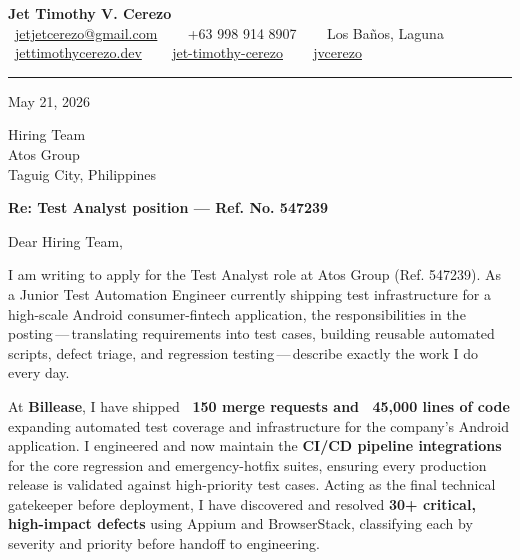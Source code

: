 \documentclass[11pt,a4paper]{article}
\begin{document}
\begin{center}
  {\LARGE\bfseries Jet Timothy V. Cerezo}\\[2pt]
  {\small\color{muted}%
    \faEnvelope\ \href{mailto:jetjetcerezo@gmail.com}{jetjetcerezo@gmail.com}
    \ \textbar\ %
    \faPhone*\ +63 998 914 8907
    \ \textbar\ %
    \faMapMarker*\ Los Ba\~nos, Laguna
    \ \textbar\ %
    \faGlobe\ \href{https://jettimothycerezo.dev}{jettimothycerezo.dev}
    \ \textbar\ %
    \faLinkedin\ \href{https://www.linkedin.com/in/jet-timothy-cerezo-126903254}{jet-timothy-cerezo}
    \ \textbar\ %
    \faGithub\ \href{https://github.com/jvcerezo}{jvcerezo}%
  }
\end{center}

\vspace{4pt}
\noindent\textcolor{ink}{\rule{\linewidth}{0.4pt}}
\vspace{8pt}

\noindent May 21, 2026

\vspace{6pt}

\noindent Hiring Team \\
Atos Group \\
Taguig City, Philippines

\vspace{8pt}

\noindent\textbf{Re: Test Analyst position --- Ref. No. 547239}

\vspace{4pt}

\noindent Dear Hiring Team,

\smallskip

I am writing to apply for the Test Analyst role at Atos Group (Ref. 547239). As a Junior Test Automation Engineer currently shipping test infrastructure for a high-scale Android consumer-fintech application, the responsibilities in the posting\,---\,translating requirements into test cases, building reusable automated scripts, defect triage, and regression testing\,---\,describe exactly the work I do every day.

\smallskip

At \textbf{Billease}, I have shipped \textbf{~150 merge requests and ~45{,}000 lines of code} expanding automated test coverage and infrastructure for the company's Android application. I engineered and now maintain the \textbf{CI/CD pipeline integrations} for the core regression and emergency-hotfix suites, ensuring every production release is validated against high-priority test cases. Acting as the final technical gatekeeper before deployment, I have discovered and resolved \textbf{30+ critical, high-impact defects} using Appium and BrowserStack, classifying each by severity and priority before handoff to engineering.
\end{document}

